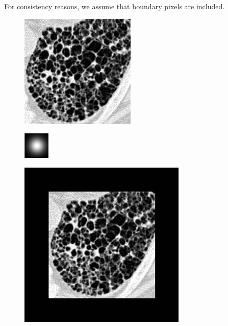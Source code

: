 \documentclass[fleqn,a4paper,oneside,openany]{book}
\begin{document}
For consistency reasons, we assume that boundary pixels are included.
%
\begin{figure}
\centering
   \begin{minipage}[b]{150pt}
     \centering
     \includegraphics[trim = 0 0 0 0, clip, scale=0.57]{originalF_BC.png}
     \label{fig:boundaryConditions1_a}
     \hspace{100pt}
   \end{minipage}
   \begin{minipage}[b]{150pt}
     \centering
     \includegraphics[trim = 0 0 0 0, clip, scale=0.57]{G_BC.png}
     \label{fig:boundaryConditions1_b}
     \hspace{100pt}
   \end{minipage}
   \begin{minipage}[b]{150pt}
     \centering
     \includegraphics[trim = 0 0 0 0, clip, scale=0.57]{ZeroPadFext_BC.png}
     \label{fig:boundaryConditions1_c}
     \hspace{100pt}

\end{minipage}
\end{figure}
\end{document}
